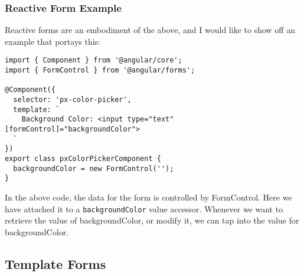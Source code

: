 \subsubsection{ Reactive Form Example }
Reactive forms are an embodiment of the above, and I would like to show off an
example that portays this: 

\begin{lstlisting}
import { Component } from '@angular/core';
import { FormControl } from '@angular/forms';
  
@Component({
  selector: 'px-color-picker',
  template: `
    Background Color: <input type="text" [formControl]="backgroundColor">
  `
})
export class pxColorPickerComponent {
  backgroundColor = new FormControl('');
}
\end{lstlisting}

In the above code, the data for the form is controlled by FormControl. Here we
have attached it to a \lstinline{backgroundColor} value accessor. Whenever we 
want to retrieve the value of backgroundColor, or modify it, we can tap into 
the value for backgroundColor. 

\subsection{Template Forms}





